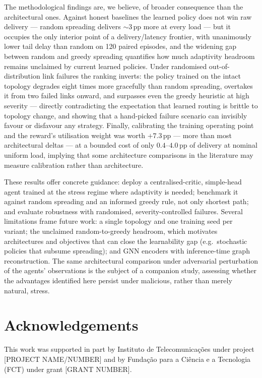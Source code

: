 \documentclass[10pt,journal,comsoc]{IEEEtran}
\begin{document}
The methodological findings are, we believe, of broader consequence than the architectural ones. Against honest baselines the learned policy does not win raw delivery --- random spreading delivers ${\sim}3$\,pp more at every load --- but it occupies the only interior point of a delivery/latency frontier, with unanimously lower tail delay than random on 120 paired episodes, and the widening gap between random and greedy spreading quantifies how much adaptivity headroom remains unclaimed by current learned policies. Under randomised out-of-distribution link failures the ranking inverts: the policy trained on the intact topology degrades eight times more gracefully than random spreading, overtakes it from two failed links onward, and surpasses even the greedy heuristic at high severity --- directly contradicting the expectation that learned routing is brittle to topology change, and showing that a hand-picked failure scenario can invisibly favour or disfavour any strategy. Finally, calibrating the training operating point and the reward's utilisation weight was worth $+7.3$\,pp --- more than most architectural deltas --- at a bounded cost of only $0.4$--$4.0$\,pp of delivery at nominal uniform load, implying that some architecture comparisons in the literature may measure calibration rather than architecture.

These results offer concrete guidance: deploy a centralised-critic, simple-head agent trained at the stress regime where adaptivity is needed; benchmark it against random spreading and an informed greedy rule, not only shortest path; and evaluate robustness with randomised, severity-controlled failures. Several limitations frame future work: a single topology and one training seed per variant; the unclaimed random-to-greedy headroom, which motivates architectures and objectives that can close the learnability gap (e.g.\ stochastic policies that subsume spreading); and GNN encoders with inference-time graph reconstruction. The same architectural comparison under adversarial perturbation of the agents' observations is the subject of a companion study, assessing whether the advantages identified here persist under malicious, rather than merely natural, stress.

\section*{Acknowledgements}
This work was supported in part by Instituto de Telecomunica\c{c}\~{o}es under project [PROJECT NAME/NUMBER] and by Funda\c{c}\~{a}o para a Ci\^{e}ncia e a Tecnologia (FCT) under grant [GRANT NUMBER].
\end{document}
